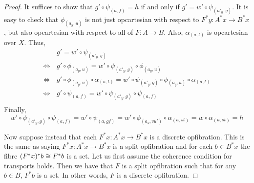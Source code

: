 \begin{proof}
  It suffices to show that $g' \circ \psi_{(a,f)} = h$
  if and only if $g' = w' \circ \psi_{(a'_y,g)}$.
  It is easy to check that $\phi_{(a_y, u)}$ is not just
  opcartesian with respect to $F^* y : A^* x \to B^* x$,
  but also opcartesian with respect to all of $F : A \to B$.
  Also, $\alpha_{(a,t)}$ is opcartesian over $X$.
  Thus, 
  \begin{align*}
    & g' = w' \circ \psi_{(a'_y,g)} \\
    \iff \, & g' \circ \phi_{(a_y, u)} = w' \circ \psi_{(a'_y,g)} \circ \phi_{(a_y, u)} \\
    \iff \, & g' \circ \phi_{(a_y, u)} \circ \alpha_{(a,t)} = w' \circ \psi_{(a'_y,g)} \circ \phi_{(a_y, u)} \circ \alpha_{(a,t)} \\
    \iff \, & g' \circ \psi_{(a,f)} = w' \circ \psi_{(a'_y,g)} \circ \psi_{(a,f)} \\
  \end{align*}
  Finally,
  \[ w' \circ \psi_{(a'_y,g)} \circ \psi_{(a,f)} = w' \circ \psi_{(a,gf)}
  = w' \circ \phi_{(a_z,vu')} \circ \alpha_{(a,st)} = w \circ \alpha_{(a,st)} = h \]

  Now suppose instead that each $F^* x : A^* x \to B^* x$ is a discrete opfibration.
  This is the same as saying $F^* x : A^* x \to B^* x$ is a split opfibration
  and for each $b \in B^* x$ the fibre
  $(F^* x)^* b \cong F^* b$ is a set.
  Let us first assume the coherence condition for transports holds.
  Then we have that $F$ is a split opfibration such that for any $b \in B$,
  $F^* b$ is a set.
  In other words, $F$ is a discrete opfibration.


\end{proof}
